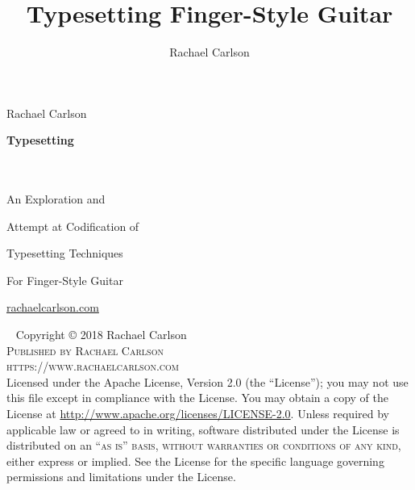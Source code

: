 \documentclass[]{memoir}
\title{Typesetting Finger-Style Guitar}
\author{Rachael Carlson}
\begin{document}
\frontmatter

\pagestyle{empty}
\begin{flushright}
  Rachael Carlson\\
\end{flushright}
\vspace*{1in}
{\Huge \textsf{\textbf{Typesetting}}}\\

\vspace*{.15in}
\\

\vspace*{.15in}
\\
\begin{flushright}
  {\Large An Exploration and} \\
\end{flushright}
\begin{flushright}
  {\Large Attempt at Codification of} \\
\end{flushright}
\begin{flushright}
  {\Large Typesetting Techniques}\\
\end{flushright}
\begin{flushright}
  {\Large For Finger-Style Guitar}\\
\end{flushright}

\vspace*{1in}

\url{rachaelcarlson.com}

\clearpage
\newpage
  ~\vfill
  \thispagestyle{empty}
  \noindent Copyright © 2018 Rachael Carlson\\

  \noindent \textsc{Published by Rachael Carlson}\\

  \noindent \textsc{https://www.rachaelcarlson.com}\\

  \noindent Licensed under the Apache License, Version 2.0 (the
  ``License''); you may not use this file except in compliance with
  the License. You may obtain a copy of the License at \url{http://www.apache.org/licenses/LICENSE-2.0}.
  Unless required by
  applicable law or agreed to in writing, software distributed under
  the License is distributed on an \textsc{``as is'' basis, without
    warranties or conditions of any kind}, either express or
  implied. See the License for the specific language governing
  permissions and limitations under the License.
\end{document}
